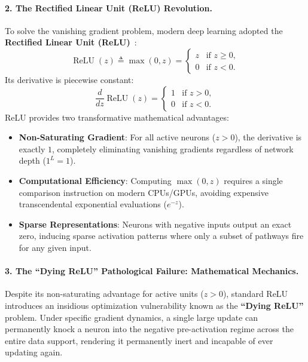 \paragraph{2. The Rectified Linear Unit (ReLU) Revolution.}
To solve the vanishing gradient problem, modern deep learning adopted the \textbf{Rectified Linear Unit (ReLU)}~\cite{glorot2011deep,nair2010rectified}:
\begin{equation}
\operatorname{ReLU}(z) \triangleq \max(0, z) = \begin{cases} z & \text{if } z \ge 0, \\ 0 & \text{if } z < 0. \end{cases}
\label{eq:relu_formula}
\end{equation}
Its derivative is piecewise constant:
\begin{equation}
\frac{d}{dz}\operatorname{ReLU}(z) = \begin{cases} 1 & \text{if } z > 0, \\ 0 & \text{if } z < 0. \end{cases}
\end{equation}
ReLU provides two transformative mathematical advantages:
\begin{itemize}[noitemsep]
  \item \textbf{Non-Saturating Gradient}: For all active neurons ($z > 0$), the derivative is exactly $1$, completely eliminating vanishing gradients regardless of network depth ($1^L = 1$).
  \item \textbf{Computational Efficiency}: Computing $\max(0, z)$ requires a single comparison instruction on modern CPUs/GPUs, avoiding expensive transcendental exponential evaluations ($e^{-z}$).
  \item \textbf{Sparse Representations}: Neurons with negative inputs output an exact zero, inducing sparse activation patterns where only a subset of pathways fire for any given input.
\end{itemize}

\paragraph{3. The ``Dying ReLU'' Pathological Failure: Mathematical Mechanics.}
Despite its non-saturating advantage for active units ($z > 0$), standard ReLU introduces an insidious optimization vulnerability known as the \textbf{``Dying ReLU''} problem. Under specific gradient dynamics, a single large update can permanently knock a neuron into the negative pre-activation regime across the entire data support, rendering it permanently inert and incapable of ever updating again.

